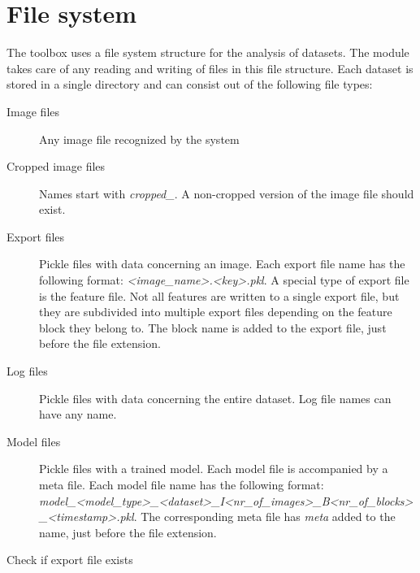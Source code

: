 \documentclass[letterpaper,10pt,english]{sphinxmanual}
\begin{document}
\chapter{File system}
\label{index:file-system}
The toolbox uses a file system structure for the analysis of datasets.
The {\hyperref[index:module-flamingo.filesys]{}} module takes care of any reading and writing of files in this file structure.
Each dataset is stored in a single directory and can consist out of the following file types:
\begin{description}
\item[{Image files}] \leavevmode
Any image file recognized by the system

\item[{Cropped image files}] \leavevmode
Names start with \emph{cropped\_}. A non-cropped version of the image file should exist.

\item[{Export files}] \leavevmode
Pickle files with data concerning an image. Each export file name has the following format: \emph{\textless{}image\_name\textgreater{}.\textless{}key\textgreater{}.pkl}.
A special type of export file is the feature file. Not all features are written to a single export file, but they
are subdivided into multiple export files depending on the feature block they belong to. The block name is added to the
export file, just before the file extension.

\item[{Log files}] \leavevmode
Pickle files with data concerning the entire dataset. Log file names can have any name.

\item[{Model files}] \leavevmode
Pickle files with a trained model. Each model file is accompanied by a meta file. Each model file name has the following format:
\emph{model\_\textless{}model\_type\textgreater{}\_\textless{}dataset\textgreater{}\_I\textless{}nr\_of\_images\textgreater{}\_B\textless{}nr\_of\_blocks\textgreater{}\_\textless{}timestamp\textgreater{}.pkl}. The corresponding meta file has \emph{meta} added to
the name, just before the file extension.

\end{description}
\label{index:module-flamingo.filesys}

\begin{fulllineitems}
\label{index:flamingo.filesys.check_export_file}
Check if export file exists

\end{fulllineitems}
\end{document}
